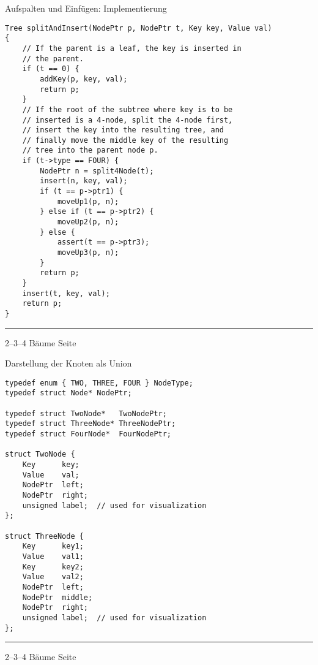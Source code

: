 
\begin{slide}{}
\normalsize

\begin{center}
Aufspalten und Einf\"ugen: Implementierung
\end{center}
\vspace*{0.5cm}

\footnotesize
\begin{verbatim}
Tree splitAndInsert(NodePtr p, NodePtr t, Key key, Value val)
{
    // If the parent is a leaf, the key is inserted in
    // the parent.
    if (t == 0) {
        addKey(p, key, val);
        return p;
    }
    // If the root of the subtree where key is to be 
    // inserted is a 4-node, split the 4-node first, 
    // insert the key into the resulting tree, and 
    // finally move the middle key of the resulting 
    // tree into the parent node p.
    if (t->type == FOUR) {
        NodePtr n = split4Node(t);
        insert(n, key, val);
        if (t == p->ptr1) {
            moveUp1(p, n);
        } else if (t == p->ptr2) {
            moveUp2(p, n);
        } else {
            assert(t == p->ptr3);
            moveUp3(p, n);
        }
        return p;
    }
    insert(t, key, val);
    return p;
}
\end{verbatim}

\vspace*{\fill}
\tiny \addtocounter{mypage}{1}
\rule{17cm}{1mm}
2--3--4 B\"aume  \hspace*{\fill} Seite 
\end{slide}


\begin{slide}{}
\normalsize

\begin{center}
Darstellung der Knoten als Union
\end{center}
\vspace*{0.5cm}

\footnotesize
\begin{verbatim}
typedef enum { TWO, THREE, FOUR } NodeType;
typedef struct Node* NodePtr;

typedef struct TwoNode*   TwoNodePtr;
typedef struct ThreeNode* ThreeNodePtr;
typedef struct FourNode*  FourNodePtr;

struct TwoNode {
    Key      key;
    Value    val;
    NodePtr  left;
    NodePtr  right;
    unsigned label;  // used for visualization
};

struct ThreeNode {
    Key      key1;
    Value    val1;
    Key      key2;
    Value    val2;
    NodePtr  left;
    NodePtr  middle;
    NodePtr  right;
    unsigned label;  // used for visualization
};
\end{verbatim}

\vspace*{\fill}
\tiny \addtocounter{mypage}{1}
\rule{17cm}{1mm}
2--3--4 B\"aume  \hspace*{\fill} Seite 
\end{slide}

